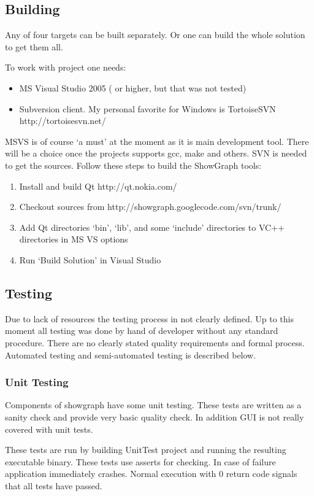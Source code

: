\documentclass[11pt,twoside,a4paper]{article}
\begin{document}
\subsection{Building}
Any of four targets can be built separately. Or one can build the whole solution to get them all.

To work with project one needs:
\begin{itemize}
\item MS Visual Studio 2005 ( or higher, but that was not tested)\
\item Subversion client. My personal favorite for Windows is TortoiseSVN http://tortoisesvn.net/
\end{itemize}

MSVS is of course `a must' at the moment as it is main development tool. There will be a choice once the projects supports gcc, make and others. SVN is needed to get the sources. Follow these steps to build the ShowGraph tools:
\begin{enumerate}
\item Install and build Qt http://qt.nokia.com/
\item Checkout sources from http://showgraph.googlecode.com/svn/trunk/
\item Add Qt directories `bin', `lib', and some `include' directories to VC++ directories in MS VS options
\item Run `Build Solution' in Visual Studio
\end{enumerate}

\subsection{Testing}
Due to lack of resources the testing process in not clearly defined. Up to this moment all testing was done by hand of developer without any standard procedure. There are no clearly stated quality requirements and formal process. Automated testing and semi-automated testing is described below.

\subsubsection{Unit Testing}
Components of showgraph have some unit testing. These tests are written as a sanity check and provide very basic quality check. In addition GUI is not really covered with unit tests.

These tests are run by building UnitTest project and running the resulting executable binary. These tests use asserts for checking. In case of failure application immediately crashes. Normal execution with 0 return code signals that all tests have passed.
\end{document}
